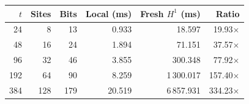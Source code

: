 \small
\begin{tabular}{rrrrrr}
\toprule
$t$ & Sites & Bits & Local (ms) & Fresh $H^1$ (ms) & Ratio\\
\midrule
24 & 8 & 13 & 0.933 & 18.597 & 19.93$\times$\\
48 & 16 & 24 & 1.894 & 71.151 & 37.57$\times$\\
96 & 32 & 46 & 3.855 & 300.348 & 77.92$\times$\\
192 & 64 & 90 & 8.259 & 1\,300.017 & 157.40$\times$\\
384 & 128 & 179 & 20.519 & 6\,857.931 & 334.23$\times$\\
\bottomrule
\end{tabular}
